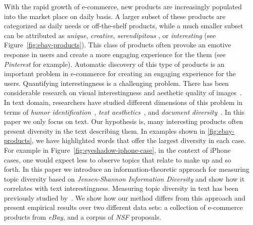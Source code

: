 \documentclass{article} %
\begin{document}
With the rapid growth of e-commerce, new products are increasingly populated into the market place on daily basis.  A larger subset of these products are 
categorized as daily needs or off-the-shelf products, while a much smaller subset can be attributed as {\em unique}, {\em creative}, {\em serendipitous }, or {\em interesting} (see Figure~\ref{fig:ebay-products}). This class of products often provoke an emotive response in users and create a more engaging experience for the them (see  {\em Pinterest} for example). Automatic discovery of this type of products is an important problem in e-commerce for creating an engaging experience for the users.   Quantifying interestingness is a challenging problem. There has been considerable research on visual interestingness and aesthetic quality of images~\cite{Datta:2006:SAP:2129560.2129588,Ke:2006:DHF:1153170.1153495,IsolaParikhTorralbaOliva2011,dhar:2011,reinecke2013predicting,journals/pami/WeinshallZHKOABGNPHP12}. 
In text domain, researchers have studied different dimensions of this problem in terms of {\em humor identification}~\cite{Mihalcea:2005:MCL:1220575.1220642,Davidov:2010:SRS:1870568.1870582,Kiddon11,labutov-lipson:2012:ACL2012short}, {\em text aesthetics}~\cite{journals:tamd:Schmidhuber10,N13-1118,ganguly:2014}, and {\em document diversity}~\cite{bache:2013}.  In this paper we only focus on text. Our hypothesis is, many interesting products often present diversity in the text describing them. In examples shown in \ref{fig:ebay-products}, we have highlighted words that offer the largest diversity in each case.
For example in Figure~\ref{fig:eyeshadow-iphone-case}, in the context of iPhone cases, one would expect less to observe topics that relate to make up and so forth. In this paper we introduce an information-theoretic approach for measuring topic diversity based on {\em Jensen-Shannon Information Diversity} and show how it correlates with text interestingness. Measuring topic diversity in text has been previously studied by~\cite{bache:2013}. We show how our method differs from this approach and present empirical results over two different data sets: a collection of e-commerce products from {\sl eBay}, and a corpus of {\sl NSF} proposals. 
\end{document}
